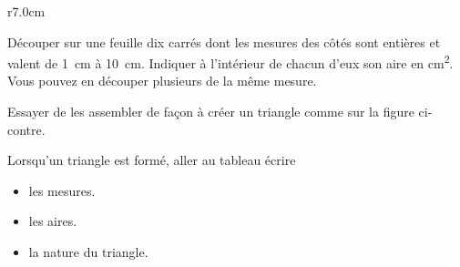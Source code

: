 

\begin{wrapfigure}{r}{7.0cm}
   \vspace{-2cm}        %
   \centering
   
\end{wrapfigure}


Découper sur une feuille dix carrés dont les mesures des côtés sont entières et valent de \SI{1}{\centi\meter} à \SI{10}{\centi\meter}. Indiquer à l'intérieur de chacun d'eux son aire en \si{\centi\meter\squared}. Vous pouvez en découper plusieurs de la même mesure.

Essayer de les assembler de façon à créer un triangle comme sur la figure ci-contre.

Lorsqu'un triangle est formé, aller au tableau écrire
\begin{itemize}
    \item les mesures.
    \item les aires.
    \item la nature du triangle.
\end{itemize}
